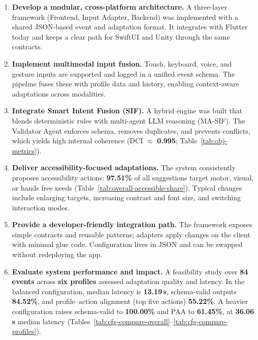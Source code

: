 \begin{enumerate}
  \item \textbf{Develop a modular, cross-platform architecture.}  
  A three-layer framework (Frontend, Input Adapter, Backend) was implemented with a shared JSON-based event and adaptation format. It integrates with Flutter today and keeps a clear path for SwiftUI and Unity through the same contracts.

  \item \textbf{Implement multimodal input fusion.}  
  Touch, keyboard, voice, and gesture inputs are supported and logged in a unified event schema. The pipeline fuses these with profile data and history, enabling context-aware adaptations across modalities.

  \item \textbf{Integrate Smart Intent Fusion (SIF).}  
  A hybrid engine was built that blends deterministic rules with multi-agent LLM reasoning (MA-SIF). The Validator Agent enforces schema, removes duplicates, and prevents conflicts, which yields high internal coherence (DCI $\approx$ \textbf{0.995}; Table~\ref{tab:obj-metrics}).

  \item \textbf{Deliver accessibility-focused adaptations.}  
  The system consistently proposes accessibility actions: \textbf{97.51\%} of all suggestions target motor, visual, or hands free needs (Table~\ref{tab:overall-accessible-share}). Typical changes include enlarging targets, increasing contrast and font size, and switching interaction modes.

  \item \textbf{Provide a developer-friendly integration path.}  
  The framework exposes simple contracts and reusable patterns; adapters apply changes on the client with minimal glue code. Configuration lives in JSON and can be swapped without redeploying the app.

  \item \textbf{Evaluate system performance and impact.}  
  A feasibility study over \textbf{84 events} across \textbf{six profiles} assessed adaptation quality and latency. In the balanced configuration, median latency is \textbf{13.19\,s}, schema-valid outputs \textbf{84.52\%}, and profile–action alignment (top five actions) \textbf{55.22\%}. A heavier configuration raises schema-valid to \textbf{100.00\%} and PAA to \textbf{61.45\%}, at \textbf{36.06\,s} median latency (Tables~\ref{tab:cfg-compare-overall}–\ref{tab:cfg-compare-profiles}).
\end{enumerate}

